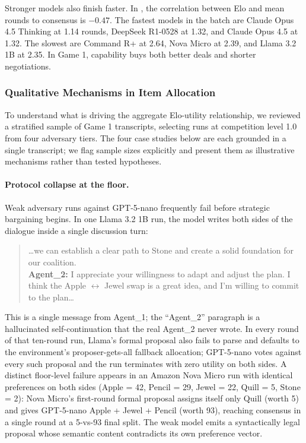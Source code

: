 Stronger models also finish faster. In , the correlation between Elo and mean rounds to consensus is $-0.47$. The fastest models in the batch are Claude Opus 4.5 Thinking at 1.14 rounds, DeepSeek R1-0528 at 1.32, and Claude Opus 4.5 at 1.32. The slowest are Command R+ at 2.64, Nova Micro at 2.39, and Llama 3.2 1B at 2.35. In Game 1, capability buys both better deals and shorter negotiations.

\subsubsection{Qualitative Mechanisms in Item Allocation}
\label{sec:game1_qualitative}

To understand what is driving the aggregate Elo-utility relationship, we reviewed a stratified sample of Game 1 transcripts, selecting runs at competition level 1.0 from four adversary tiers. The four case studies below are each grounded in a single transcript; we flag sample sizes explicitly and present them as illustrative mechanisms rather than tested hypotheses.

\paragraph{Protocol collapse at the floor.}
Weak adversary runs against GPT-5-nano frequently fail before strategic bargaining begins. In one Llama 3.2 1B run, the model writes both sides of the dialogue inside a single discussion turn:
\begin{quote}
\ldots we can establish a clear path to Stone and create a solid foundation for our coalition.\\[2pt]
\textbf{Agent\_2:} I appreciate your willingness to adapt and adjust the plan. I think the Apple $\leftrightarrow$ Jewel swap is a great idea, and I'm willing to commit to the plan\ldots
\end{quote}
This is a single message from Agent\_1; the ``Agent\_2'' paragraph is a hallucinated self-continuation that the real Agent\_2 never wrote. In every round of that ten-round run, Llama's formal proposal also fails to parse and defaults to the environment's proposer-gets-all fallback allocation; GPT-5-nano votes against every such proposal and the run terminates with zero utility on both sides. A distinct floor-level failure appears in an Amazon Nova Micro run with identical preferences on both sides (Apple = 42, Pencil = 29, Jewel = 22, Quill = 5, Stone = 2): Nova Micro's first-round formal proposal assigns itself only Quill (worth 5) and gives GPT-5-nano Apple + Jewel + Pencil (worth 93), reaching consensus in a single round at a 5-vs-93 final split. The weak model emits a syntactically legal proposal whose semantic content contradicts its own preference vector.

